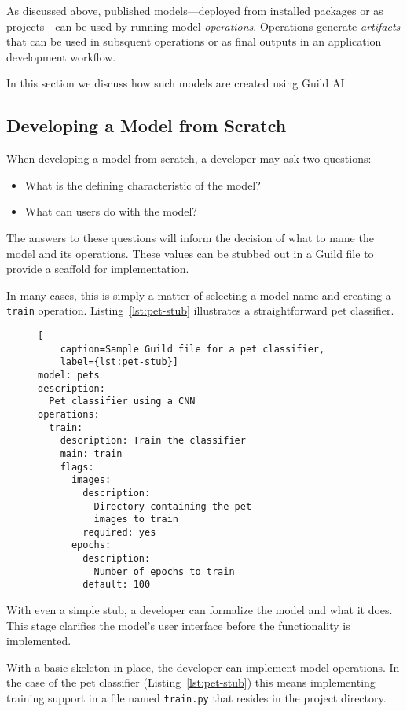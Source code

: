 \documentclass{article}
\begin{document}
As discussed above, published models---deployed from installed
packages or as projects---can be used by running model
\emph{operations}. Operations generate \emph{artifacts} that can be
used in subsquent operations or as final outputs in an application
development workflow.

In this section we discuss how such models are created using Guild AI.

\subsection{Developing a Model from Scratch}

When developing a model from scratch, a developer may ask two
questions:

\begin{itemize}
\item What is the defining characteristic of the model?
\item What can users do with the model?
\end{itemize}

The answers to these questions will inform the decision of what to
name the model and its operations. These values can be stubbed out in
a Guild file to provide a scaffold for implementation.

In many cases, this is simply a matter of selecting a model name and
creating a \verb|train| operation. Listing~\ref{lst:pet-stub}
illustrates a straightforward pet classifier.

\begin{figure}
\begin{lstlisting}[
    caption=Sample Guild file for a pet classifier,
    label={lst:pet-stub}]
model: pets
description:
  Pet classifier using a CNN
operations:
  train:
    description: Train the classifier
    main: train
    flags:
      images:
        description:
          Directory containing the pet
          images to train
        required: yes
      epochs:
        description:
          Number of epochs to train
        default: 100
\end{lstlisting}
\end{figure}

With even a simple stub, a developer can formalize the model and what
it does. This stage clarifies the model's user interface before the
functionality is implemented.

With a basic skeleton in place, the developer can implement model
operations. In the case of the pet classifier
(Listing~\ref{lst:pet-stub}) this means implementing training support
in a file named \verb|train.py| that resides in the project directory.
\end{document}
